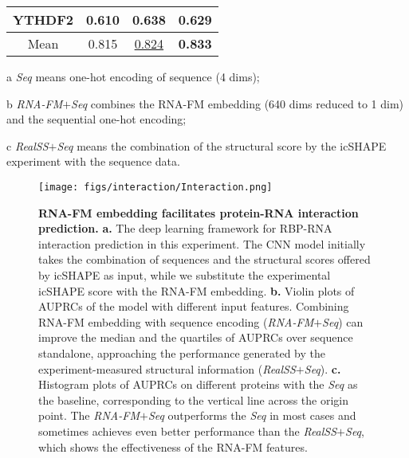 \begin{table}[!t]
\begin{threeparttable}
\begin{tabular}{cccc}
YTHDF2     & 0.610        & \textbf{0.638}         & 0.629       \\
\midrule
Mean    & 0.815 & \underline{0.824}   & \textbf{0.833} \\
\bottomrule
\end{tabular}
\begin{tablenotes}
        \footnotesize
        \item[a] \textit{Seq} means one-hot encoding of sequence (4 dims); \item[b] \textit{RNA-FM$+$Seq} combines the RNA-FM embedding (640 dims reduced to 1 dim) and the sequential one-hot encoding; \item[c] \textit{RealSS$+$Seq} means the combination of the structural score by the icSHAPE experiment with the sequence data.  %
      \end{tablenotes}
\end{threeparttable}



\end{table}

\begin{figure}[!t]
    \centering
    \texttt{[image: figs/interaction/Interaction.png]}
    \caption{\textbf{RNA-FM embedding facilitates protein-RNA interaction prediction.} \textbf{a.} The deep learning framework for RBP-RNA interaction prediction in this experiment. The CNN model initially takes the combination of sequences and the structural scores offered by icSHAPE as input, while we substitute the experimental icSHAPE score with the RNA-FM embedding. \textbf{b.} Violin plots of AUPRCs of the model with different input features. Combining RNA-FM embedding with sequence encoding (\textit{RNA-FM$+$Seq}) can improve the median and the quartiles of AUPRCs over sequence standalone, approaching the performance generated by the experiment-measured structural information (\textit{RealSS$+$Seq}). \textbf{c.} Histogram plots of AUPRCs on different proteins with the \textit{Seq} as the baseline, corresponding to the vertical line across the origin point. The \textit{RNA-FM$+$Seq} outperforms the \textit{Seq} in most cases and sometimes achieves even better performance than the \textit{RealSS$+$Seq}, which shows the effectiveness of the RNA-FM features.}
    \label{fig:RBP}
\end{figure}

